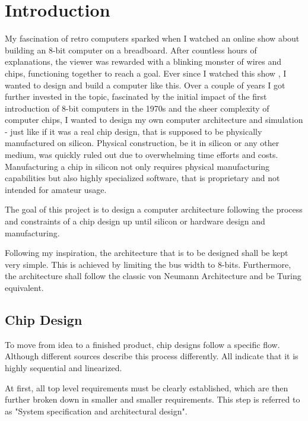 \chapter{Introduction}
My fascination of retro computers sparked when I watched an online show about building an 8-bit computer on a breadboard. After countless hours of explanations, the viewer was rewarded with a blinking monster of wires and chips, functioning together to reach a goal. Ever since I watched this show \cite{beneater}, I wanted to design and build a computer like this. Over a couple of years I got further invested in the topic, fascinated by the initial impact of the first introduction of 8-bit computers in the 1970s and the sheer complexity of computer chips, I wanted to design my own computer architecture and simulation - just like if it was a real chip design, that is supposed to be physically manufactured on silicon. Physical construction, be it in silicon or any other medium, was quickly ruled out due to overwhelming time efforts and costs. Manufacturing a chip in silicon not only requires physical manufacturing capabilities but also highly specialized software, that is proprietary and not intended for amateur usage. 

The goal of this project is to design a computer architecture following the process and constraints of a chip design up until silicon or hardware design and manufacturing.

Following my inspiration, the architecture that is to be designed shall be kept very simple. This is achieved by limiting the bus width to 8-bits. Furthermore, the architecture shall follow the classic von Neumann Architecture and be Turing equivalent.  


\section{Chip Design} \label{sec:chip-design}
To move from idea to a finished product, chip designs follow a specific flow. Although different sources describe this process differently. All indicate that it is highly sequential and linearized.

At first, all top level requirements must be clearly established, which are then further broken down in smaller and smaller requirements. This step is referred to as "System specification and architectural design".

